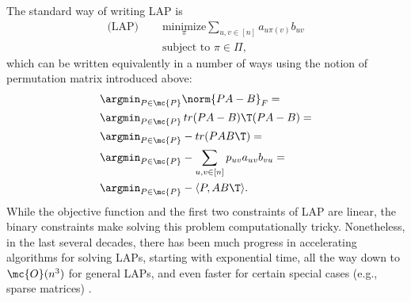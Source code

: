 \documentclass[10pt,journal,cspaper,compsoc]{IEEEtran}
\newcommand{\PmcP}{P \in \mc{P}}
\begin{document}
The standard way of writing LAP is
\begin{subequations} \label{eq:LAP}
\begin{align}
	 \text{(LAP) }\quad  &\underset{\pi}{\text{minimize}} \sum_{u,v \in [n]} a_{u \pi(v)} b_{uv} \\
	&\text{subject to } \pi \in \Pi,
\end{align}
\end{subequations}
which can be written equivalently in a number of ways using the notion of permutation matrix introduced above:
\begin{subequations} \label{eq:LAP2}
\begin{align}
	&\argmin_{\PmcP} \norm{PA - B}_F =\\
	&\argmin_{\PmcP} \, tr(PA-B)\T (PA-B)=\\ 
	&\argmin_{\PmcP}  -tr (P AB\T) =\\
	&\argmin_{\PmcP}  -\sum_{u,v \in [n]} p_{uv} a_{uv} b_{vu}
	=\\&\argmin_{\PmcP}  -\langle P, AB\T \rangle. \label{eq:dotLAP}
\end{align}
\end{subequations}
While the objective function and the first two constraints of LAP are linear, the binary constraints make solving this problem computationally tricky.  Nonetheless, in the last several decades, there has been much progress in accelerating algorithms for solving LAPs, starting with exponential time, all the way down to $\mc{O}(n^3)$ for general LAPs, and even faster for certain special cases (e.g., sparse matrices) \cite{Burkard2009}.
\end{document}
